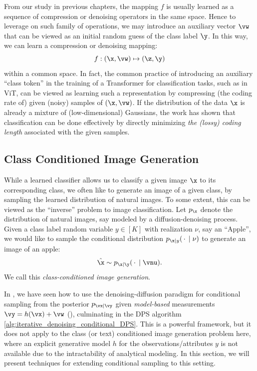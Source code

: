 \documentclass[../../book-main.tex]{subfiles}
\begin{document}
From our study in previous chapters, the mapping $f$ is usually learned as a sequence of compression or denoising operators in the same space. Hence to leverage on such family of operations, we may introduce an auxiliary vector $\vw$ that can be viewed as an initial random guess of the class label $\y$. In this way, we can learn a compression or denoising mapping:
\begin{equation}\label{eq:classifier-with-class-token}
    f: (\x, \vw) \mapsto (\z, \y)
\end{equation}
within a common space. In fact, the common practice of introducing an auxiliary ``class token'' in the training of a Transformer for classification tasks, such as in ViT, can be viewed as learning such a representation by compressing (the coding rate of) given (noisy) samples of $(\x, \vw)$. If the distribution of the data $\x$ is already a mixture of (low-dimensional) Gaussians, the work \cite{wright2008classification} has shown that classification can be done effectively by directly minimizing {\em the (lossy) coding length} associated with the given samples.


\subsection{Class Conditioned Image Generation}\label{sub:cfg} 
While a learned classifier allows us to classify a given image $\x$ to its
corresponding class, we often like to generate an image of a given class, by
sampling the learned distribution of natural images. To some extent, this can be
viewed as the ``inverse'' problem to image classification. Let $p_{\x}$ denote
the distribution of natural images, say modeled by a diffusion-denoising
process. Given a class label random variable $y \in [K]$ with realization $\nu$, say
an ``Apple'', we would like to sample the conditional distribution $p_{\x \mid
y}(\,\cdot\, \mid \nu)$ to generate an image of an apple:
\begin{equation}
  \hat{\x} \sim p_{\x\mid \y}(\,\cdot\, \mid \vnu).
\end{equation}
We call this {\em class-conditioned image generation}.

In , we have seen how to use the denoising-diffusion paradigm for
conditional sampling from the posterior $p_{\vx \mid \vy}$ given
\textit{model-based} measurements $\vy = h(\vx) + \vw$
(), culminating in the
DPS algorithm \eqref{alg:iterative_denoising_conditional_DPS}. This is a powerful
framework, but it does not apply to the class (or text) conditioned image
generation problem here, where an explicit generative model $h$ for the
observations/attributes $y$ is not available due to the
intractability of analytical modeling. In this section, we will present techniques for extending
conditional sampling to this setting.
\end{document}

